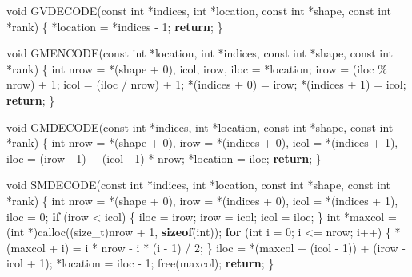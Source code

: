 \documentclass[
  12pt,
]{article}
\newenvironment{Shaded}{\begin{snugshade}}{\end{snugshade}}
\newcommand{\ControlFlowTok}[1]{\textcolor[rgb]{0.13,0.29,0.53}{\textbf{#1}}}
\newcommand{\DataTypeTok}[1]{\textcolor[rgb]{0.13,0.29,0.53}{#1}}
\newcommand{\DecValTok}[1]{\textcolor[rgb]{0.00,0.00,0.81}{#1}}
\newcommand{\KeywordTok}[1]{\textcolor[rgb]{0.13,0.29,0.53}{\textbf{#1}}}
\newcommand{\NormalTok}[1]{#1}
\begin{document}
\begin{Shaded}
\begin{Highlighting}[]
\DataTypeTok{void}\NormalTok{ GVDECODE(}\DataTypeTok{const} \DataTypeTok{int}\NormalTok{ *indices, }\DataTypeTok{int}\NormalTok{ *location, }\DataTypeTok{const} \DataTypeTok{int}\NormalTok{ *shape,}
              \DataTypeTok{const} \DataTypeTok{int}\NormalTok{ *rank) \{}
\NormalTok{  *location = *indices {-} }\DecValTok{1}\NormalTok{;}
  \ControlFlowTok{return}\NormalTok{;}
\NormalTok{\}}

\DataTypeTok{void}\NormalTok{ GMENCODE(}\DataTypeTok{const} \DataTypeTok{int}\NormalTok{ *location, }\DataTypeTok{int}\NormalTok{ *indices, }\DataTypeTok{const} \DataTypeTok{int}\NormalTok{ *shape,}
              \DataTypeTok{const} \DataTypeTok{int}\NormalTok{ *rank) \{}
  \DataTypeTok{int}\NormalTok{ nrow = *(shape + }\DecValTok{0}\NormalTok{), icol, irow, iloc = *location;}
\NormalTok{  irow = (iloc \% nrow) + }\DecValTok{1}\NormalTok{;}
\NormalTok{  icol = (iloc / nrow) + }\DecValTok{1}\NormalTok{;}
\NormalTok{  *(indices + }\DecValTok{0}\NormalTok{) = irow;}
\NormalTok{  *(indices + }\DecValTok{1}\NormalTok{) = icol;}
  \ControlFlowTok{return}\NormalTok{;}
\NormalTok{\}}

\DataTypeTok{void}\NormalTok{ GMDECODE(}\DataTypeTok{const} \DataTypeTok{int}\NormalTok{ *indices, }\DataTypeTok{int}\NormalTok{ *location, }\DataTypeTok{const} \DataTypeTok{int}\NormalTok{ *shape,}
              \DataTypeTok{const} \DataTypeTok{int}\NormalTok{ *rank) \{}
  \DataTypeTok{int}\NormalTok{ nrow = *(shape + }\DecValTok{0}\NormalTok{), irow = *(indices + }\DecValTok{0}\NormalTok{), icol = *(indices + }\DecValTok{1}\NormalTok{),}
\NormalTok{      iloc = (irow {-} }\DecValTok{1}\NormalTok{) + (icol {-} }\DecValTok{1}\NormalTok{) * nrow;}
\NormalTok{  *location = iloc;}
  \ControlFlowTok{return}\NormalTok{;}
\NormalTok{\}}

\DataTypeTok{void}\NormalTok{ SMDECODE(}\DataTypeTok{const} \DataTypeTok{int}\NormalTok{ *indices, }\DataTypeTok{int}\NormalTok{ *location, }\DataTypeTok{const} \DataTypeTok{int}\NormalTok{ *shape,}
              \DataTypeTok{const} \DataTypeTok{int}\NormalTok{ *rank) \{}
  \DataTypeTok{int}\NormalTok{ nrow = *(shape + }\DecValTok{0}\NormalTok{), irow = *(indices + }\DecValTok{0}\NormalTok{), icol = *(indices + }\DecValTok{1}\NormalTok{),}
\NormalTok{      iloc = }\DecValTok{0}\NormalTok{;}
  \ControlFlowTok{if}\NormalTok{ (irow \textless{} icol) \{}
\NormalTok{    iloc = irow;}
\NormalTok{    irow = icol;}
\NormalTok{    icol = iloc;}
\NormalTok{  \}}
  \DataTypeTok{int}\NormalTok{ *maxcol = (}\DataTypeTok{int}\NormalTok{ *)calloc((}\DataTypeTok{size\_t}\NormalTok{)nrow + }\DecValTok{1}\NormalTok{, }\KeywordTok{sizeof}\NormalTok{(}\DataTypeTok{int}\NormalTok{));}
  \ControlFlowTok{for}\NormalTok{ (}\DataTypeTok{int}\NormalTok{ i = }\DecValTok{0}\NormalTok{; i \textless{}= nrow; i++) \{}
\NormalTok{    *(maxcol + i) = i * nrow {-} i * (i {-} }\DecValTok{1}\NormalTok{) / }\DecValTok{2}\NormalTok{;}
\NormalTok{  \}}
\NormalTok{  iloc = *(maxcol + (icol {-} }\DecValTok{1}\NormalTok{)) + (irow {-} icol + }\DecValTok{1}\NormalTok{);}
\NormalTok{  *location = iloc {-} }\DecValTok{1}\NormalTok{;}
\NormalTok{  free(maxcol);}
  \ControlFlowTok{return}\NormalTok{;}
\NormalTok{\}}


\end{Highlighting}
\end{Shaded}
\end{document}
